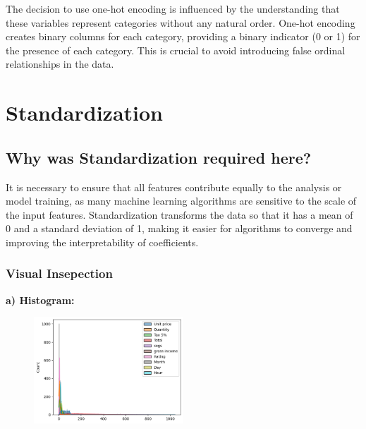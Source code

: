 The decision to use one-hot encoding is influenced by the understanding that these variables represent categories without any natural order. One-hot encoding creates binary columns for each category, providing a binary indicator (0 or 1) for the presence of each category. This is crucial to avoid introducing false ordinal relationships in the data.


\section{Standardization}

\subsection{Why was Standardization required here?}

It is necessary to ensure that all features contribute equally to the analysis or model training, as many machine learning algorithms are sensitive to the scale of the input features. Standardization transforms the data so that it has a mean of 0 and a standard deviation of 1, making it easier for algorithms to converge and improving the interpretability of coefficients.



\subsubsection{Visual Insepection}

\textbf{a) Histogram:} 
\begin{figure}[h]
    \centering
    \includegraphics[width=0.5\textwidth]{Chapters/ch2/ch_2_line_graph_1.png}
\end{figure}

